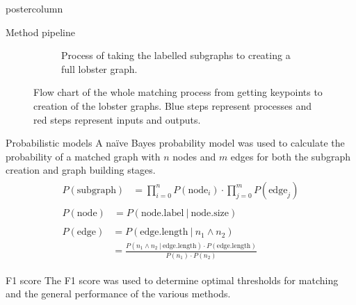 \documentclass{beamer}
\begin{document}
\begin{frame}
\begin{columns}
\begin{column}{.57\textwidth}
\begin{beamercolorbox}[center]{postercolumn}
\begin{minipage}{.98\textwidth}
{\begin{myblock}{Method pipeline}
\begin{center}
\begin{minipage}{0.9\textwidth}
\begin{figure}[H]
\begin{subfigure}{\textwidth}
\caption{Process of taking the labelled subgraphs to creating a full lobster graph.}
\end{subfigure}
\caption{Flow chart of the whole matching process from getting keypoints to creation of the lobster graphs. Blue steps represent processes and red steps represent inputs and outputs.}
\label{fig:overview}
\end{figure}
\end{minipage}
\end{center}
\end{myblock}

\begin{myblock}{Probabilistic models}
A na\"{i}ve Bayes probability model was used to calculate the probability of a matched graph with $n$ nodes and $m$ edges for both the subgraph creation and graph building stages.
\vspace{-0.4cm}
\begin{align}
\begin{split}
P(\text{subgraph}) &= \prod_{i=0}^n P(\text{node}_{i}) \cdot \prod_{j=0}^m P(\text{edge}_{j})
\end{split}
\\
\begin{split}
P(\text{node}) &= P(\text{node.label}\ |\ \text{node.size})
\end{split}
\\[10pt]
\begin{split}
P(\text{edge}) &= P(\text{edge.length}\ |\ n_{1} \wedge n_{2}) \\
 &= \frac{P(n_{1} \wedge n_{2}\ |\ \text{edge.length}) \cdot P(\text{edge.length})}{P(n_{1}) \cdot P(n_{2})}
\end{split}
\end{align}

\end{myblock}

\begin{myblock}{F1 score}
The F1 score was used to determine optimal thresholds for matching and the general performance of the various methods.


\end{myblock}}
\end{minipage}
\end{beamercolorbox}
\end{column}
\end{columns}
\end{frame}
\end{document}
